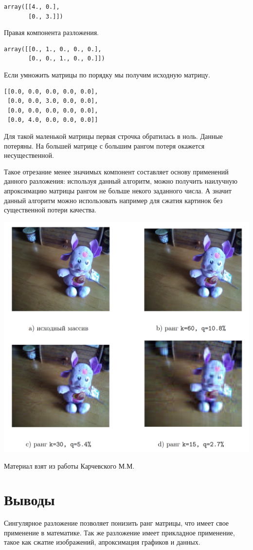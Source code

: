 \documentclass[pdf, unicode, 12pt, a4paper,oneside,fleqn]{article}
\begin{document}
\begin{lstlisting}
array([[4., 0.],
       [0., 3.]])
\end{lstlisting}

Правая компонента разложения.

\begin{lstlisting}
array([[0., 1., 0., 0., 0.],
       [0., 0., 1., 0., 0.]])
\end{lstlisting}

Если умножить матрицы по порядку мы получим исходную матрицу.

\begin{lstlisting}
[[0.0, 0.0, 0.0, 0.0, 0.0],
 [0.0, 0.0, 3.0, 0.0, 0.0],
 [0.0, 0.0, 0.0, 0.0, 0.0],
 [0.0, 4.0, 0.0, 0.0, 0.0]]
\end{lstlisting}

Для такой маленькой матрицы первая строчка обратилась в ноль. Данные потеряны. На большей матрице с большим рангом потеря окажется несущественной.

Такое отрезание менее значимых компонент составляет основу применений данного разложения: используя данный алгоритм, можно получить наилучную апроксимацию матрицы рангом не больше некого заданного числа. А значит данный алгоритм можно использовать например для сжатия картинок без существенной потери качества.

\includegraphics[scale=0.3]{data3.png}

Материал взят из работы Карчевского М.М.

\section{Выводы}

Сингулярное разложение позволяет понизить ранг матрицы, что имеет свое применение в математике. Так же разложение имеет прикладное применение, такое как сжатие изображений, апроксимация графиков и данных.
\end{document}
